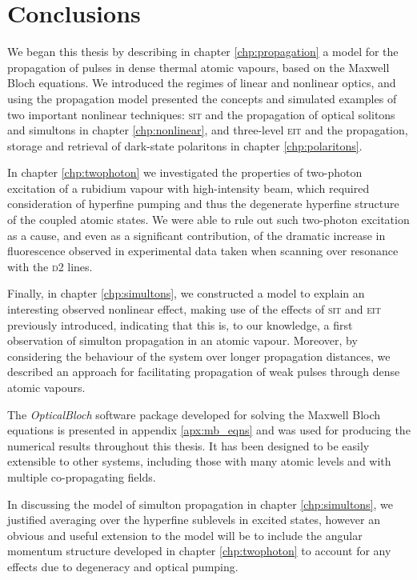 \chapter[Conclusions]
  {Conclusions}
  \label{chp:conclusions}

  We began this thesis by describing in chapter \ref{chp:propagation} a model
  for the propagation of pulses in dense thermal atomic vapours, based on the
  Maxwell Bloch equations. We introduced the regimes of linear and nonlinear
  optics, and using the propagation model presented the concepts and simulated
  examples of two important nonlinear techniques: \textsc{sit} and the
  propagation of optical solitons and simultons in chapter \ref{chp:nonlinear},
  and three-level \textsc{eit} and the propagation, storage and retrieval of
  dark-state polaritons in chapter \ref{chp:polaritons}.

  In chapter \ref{chp:twophoton} we investigated the properties of two-photon
  excitation of a rubidium vapour with high-intensity beam, which required
  consideration of hyperfine pumping and thus the degenerate hyperfine structure
  of the coupled atomic states. We were able to rule out such two-photon
  excitation as a cause, and even as a significant contribution, of the dramatic
  increase in fluorescence observed in experimental data taken when scanning
  over resonance with the \textsc{d2} lines.

  Finally, in chapter \ref{chp:simultons}, we constructed a model to explain an
  interesting observed nonlinear effect, making use of the effects of
  \textsc{sit} and \textsc{eit} previously introduced, indicating that this is,
  to our knowledge, a first observation of simulton propagation in an atomic
  vapour. Moreover, by considering the behaviour of the system over longer
  propagation distances, we described an approach for facilitating propagation
  of weak pulses through dense atomic vapours.

  The \textit{OpticalBloch} software package developed for solving the Maxwell
  Bloch equations is presented in appendix \ref{apx:mb_eqns} and was used for
  producing the numerical results throughout this thesis. It has been designed
  to be easily extensible to other systems, including those with many atomic
  levels and with multiple co-propagating fields.

  In discussing the model of simulton propagation in chapter
  \ref{chp:simultons}, we justified averaging over the hyperfine sublevels in
  excited states, however an obvious and useful extension to the model will be
  to include the angular momentum structure developed in chapter
  \ref{chp:twophoton} to account for any effects due to degeneracy and optical
  pumping.

